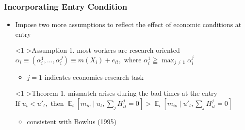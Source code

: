 \documentclass[11pt]{beamer}
\begin{document}
\begin{frame}
	\frametitle{Incorporating Entry Condition}
	\begin{itemize}
		\item Impose two more assumptions to reflect the effect of economic conditions at entry
		\begin{block}<1->{Assumption 1. most workers are research-oriented}
			$\alpha_{i}\equiv \left( \alpha_{i}^1,...,\alpha_{i}^J\right) \equiv m(X_i)+e_{it}, \text{ where }  \alpha_{i}^1 \geqq \max_{j\ne 1} \alpha_{i}^j $  
		\end{block}
	\begin{itemize}
		\item $j=1$ indicates economics-research task 
	\end{itemize}

		\begin{block}<1->{Theorem 1. mismatch arises during the bad times at the entry}
		$\text{If } u_t < u'_{t},\text{ then }\mathop{{}\mathbb{E}}_{i}\left[ m_{io} \mid u_t, \sum_{j} H_{it}^{j} = 0 \right] > \mathop{{}\mathbb{E}}_{i}\left[ m_{io} \mid u'_{t}, \sum_{j} H_{it}^{j} = 0 \right]$
		\end{block}
		\begin{itemize}
			\item consistent with Bowlus (1995)
		\end{itemize}
	\end{itemize}
\end{frame}
\end{document}
